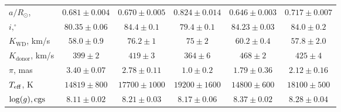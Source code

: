 \begin{landscape}
\begin{table}
\begin{tabular}{lccccc}
            $a/R_\odot$,               & $0.681\pm0.004$         & $0.670\pm0.005$          & $0.824\pm0.014$           & $0.646\pm0.003$           & $0.717\pm0.007$ \\
            $i, ^\circ$                & $80.35\pm0.06$          & $84.4\pm0.1$             & $79.4\pm0.1$              & $84.23\pm0.03$            & $84.0\pm0.2$ \\
            $K_\mathrm{WD}$, km/s      & $58.0\pm0.9$            & $76.2\pm1$               & $75\pm2$                  & $60.2\pm0.4$              & $57.8\pm2.0$ \\
            $K_\mathrm{donor}$, km/s   & $399\pm2$               & $419\pm3$                & $364\pm6$                 & $468\pm2$                 & $425\pm4$ \\
            \hline
            $\pi$, mas                 & $3.40\pm0.07$           & $2.78\pm0.11$            & $1.0\pm0.2$               & $1.79\pm0.36$             & $2.12\pm0.16$ \\
            $T_{\rm eff}$, K           & $14819\pm800$           & $17700\pm1000$           & $19200\pm1600$            & $14800\pm600$             & $18100\pm500$ \\
            $\log(g), {\rm cgs}$       & $8.11\pm0.02$           & $8.21\pm0.03$            & $8.17\pm0.06$             & $8.37\pm0.02$             & $8.28\pm0.04$ \\
            \hline
            \hline
        \end{tabular}
    \end{table}


\end{landscape}
